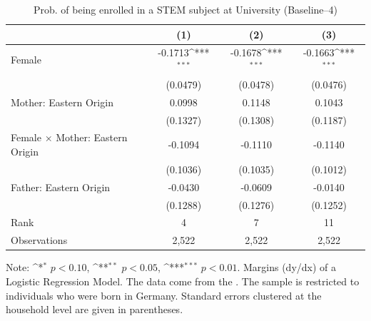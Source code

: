 \documentclass[a4paper, oneside, hyperfootnotes = false]{article}
\def\sym#1{\ifmmode^{#1}\else\(^{#1}\)\fi}
\begin{document}
{\begin{table}[ht]
	\caption[STEM subject at University (Baseline--4)]{Prob. of being enrolled in a STEM subject at University (Baseline--4)}
	\label{tab:baseline--4}
	\begin{center}
		\begin{tabular}{l*{3}{c}}
			\toprule
			&\multicolumn{1}{c}{(1)}         &\multicolumn{1}{c}{(2)}         &\multicolumn{1}{c}{(3)}         \\
			\midrule
			Female              &     -0.1713\sym{***}&     -0.1678\sym{***}&     -0.1663\sym{***}\\
			&    (0.0479)         &    (0.0478)         &    (0.0476)         \\
			\addlinespace
			Mother: Eastern Origin&      0.0998         &      0.1148         &      0.1043         \\
			&    (0.1327)         &    (0.1308)         &    (0.1187)         \\
			\addlinespace
			Female $\times$ Mother: Eastern Origin&     -0.1094         &     -0.1110         &     -0.1140         \\
			&    (0.1036)         &    (0.1035)         &    (0.1012)         \\
			\addlinespace
			Father: Eastern Origin&     -0.0430         &     -0.0609         &     -0.0140         \\
			&    (0.1288)         &    (0.1276)         &    (0.1252)         \\
			\midrule
			Rank                &      4         &     7         &     11         \\
			Observations                   &   2,522         &   2,522         &   2,522         \\
			\bottomrule
		\end{tabular}
		
		\vspace{2mm}
		
		\parbox{10cm}{
			\linespread{1}\footnotesize Note: \sym{*} \(p<0.10\), \sym{**} \(p<0.05\), \sym{***} \(p<0.01\). Margins (dy/dx) of a Logistic Regression Model. The data come from the \cite{SOEP2023}. The sample is restricted to individuals who were born in Germany. Standard errors clustered at the household level are given in parentheses.}
		
	\end{center}
\end{table}

}
\end{document}
